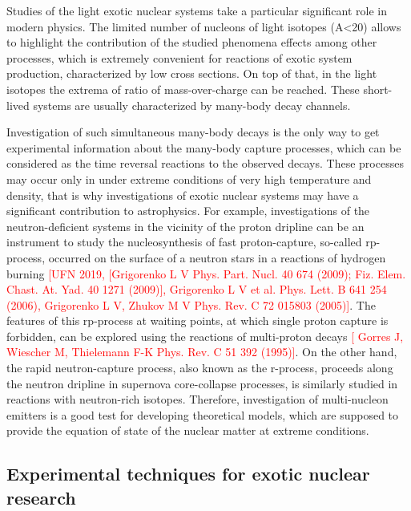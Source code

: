 Studies of the light exotic nuclear systems take a particular significant role in modern physics.
The limited number of nucleons of light isotopes (A<20) allows to highlight the contribution of the studied phenomena effects among other processes, which is extremely convenient for reactions of exotic system production, characterized by low cross sections.
On top of that, in the light isotopes the extrema of ratio of mass-over-charge can be reached.
These short-lived systems are usually characterized by many-body decay channels.

Investigation of such simultaneous many-body decays is the only way to get experimental information about the many-body capture processes, which can be considered as the time reversal reactions to the observed decays.
These processes may occur only in under extreme conditions of very high temperature and density, that is why investigations of exotic nuclear systems may have a significant contribution to astrophysics.
For example, investigations of the neutron-deficient systems in the vicinity of the proton dripline can be an instrument to study the nucleosynthesis of fast proton-capture, so-called rp-process, occurred on the surface of a neutron stars in a reactions of hydrogen burning \textcolor{red}{[UFN 2019, [Grigorenko L V Phys. Part. Nucl. 40 674 (2009); Fiz. Elem. Chast. At. Yad. 40 1271 (2009)],  Grigorenko L V et al. Phys. Lett. B 641 254 (2006),  Grigorenko L V, Zhukov M V Phys. Rev. C 72 015803 (2005)]}. 
The features of this rp-process at waiting points, at which single proton capture is forbidden, can be explored using the reactions of multi-proton decays \textcolor{red}{[ Gorres J, Wiescher M, Thielemann F-K Phys. Rev. C 51 392 (1995)]}.
On the other hand, the rapid neutron-capture process, also known as the r-process, proceeds along the neutron dripline in supernova core-collapse processes, is similarly studied in reactions with neutron-rich isotopes.
Therefore, investigation of multi-nucleon emitters is a good test for developing theoretical models, which are supposed to provide the equation of state of the nuclear matter at extreme conditions. 

\subsection{Experimental techniques for exotic nuclear research}

